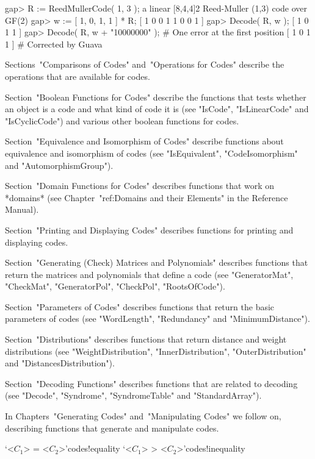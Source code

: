 \beginexample
gap> R := ReedMullerCode( 1, 3 );
a linear [8,4,4]2 Reed-Muller (1,3) code over GF(2)
gap> w := [ 1, 0, 1, 1 ] * R;
[ 1 0 0 1 1 0 0 1 ]
gap> Decode( R, w );
[ 1 0 1 1 ]
gap> Decode( R, w + "10000000" ); # One error at the first position
[ 1 0 1 1 ]                       # Corrected by Guava 
\endexample

Sections~"Comparisons of Codes" and~"Operations for Codes"  describe  the
operations that are available for codes.

Section~"Boolean Functions for Codes" describe the functions  that  tests
whether an object is a code and what kind of code it  is  (see  "IsCode",
"IsLinearCode" and "IsCyclicCode") and various  other  boolean  functions
for codes.

Section~"Equivalence and Isomorphism of Codes" describe  functions  about
equivalence   and   isomorphism    of    codes    (see    "IsEquivalent",
"CodeIsomorphism" and "AutomorphismGroup").

Section~"Domain Functions for Codes" describes  functions  that  work  on
*domains* (see Chapter~"ref:Domains and their  Elements"  in  the  {\GAP}
Reference Manual).

Section~"Printing and Displaying Codes" describes functions for  printing
and displaying codes.

Section~"Generating (Check) Matrices and Polynomials" describes functions
that return  the  matrices  and  polynomials  that  define  a  code  (see
"GeneratorMat", "CheckMat", "GeneratorPol", "CheckPol", "RootsOfCode").

Section~"Parameters of Codes" describes functions that return  the  basic
parameters    of    codes    (see    "WordLength",    "Redundancy"    and
"MinimumDistance").

Section~"Distributions" describes  functions  that  return  distance  and
weight  distributions  (see  "WeightDistribution",   "InnerDistribution",
"OuterDistribution" and "DistancesDistribution").

Section~"Decoding Functions" describes  functions  that  are  related  to
decoding (see "Decode", "Syndrome", "SyndromeTable" and "StandardArray").

In Chapters~"Generating Codes" and~"Manipulating  Codes"  we  follow  on,
describing functions that generate and manipulate codes.


\>`<$C_1$> = <$C_2$>'{codes!equality}
\>`<$C_1$> \<> <$C_2$>'{codes!inequality}

